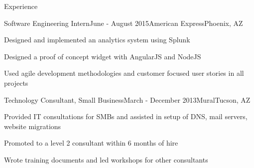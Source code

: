 \documentclass{resume} %
\begin{document}
\begin{rSection}{Experience}

\begin{rSubsection}{Software Engineering Intern}{June - August 2015}{American Express}{Phoenix, AZ}
\item Designed and implemented an analytics system using Splunk 
\item Designed a proof of concept widget with AngularJS and NodeJS
\item Used agile development methodologies and customer focused user stories in all projects
\end{rSubsection}



\begin{rSubsection}{Technology Consultant, Small Business}{March - December 2013}{Mural}{Tucson, AZ}
	\item Provided IT consultations for SMBs and assisted in setup of DNS, mail servers, website migrations
	\item Promoted to a level 2 consultant within 6 months of hire
	\item Wrote training documents and led workshops for other consultants
\end{rSubsection}



\end{rSection}
\end{document}

